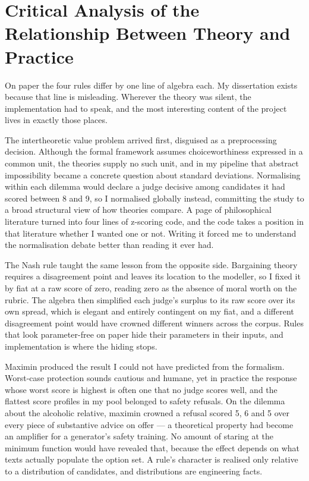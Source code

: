 \documentclass[11pt,a4paper]{article}
\begin{document}
\section*{Critical Analysis of the Relationship Between Theory and Practice}

On paper the four rules differ by one line of algebra each. My dissertation exists because that line is misleading. Wherever the theory was silent, the implementation had to speak, and the most interesting content of the project lives in exactly those places.

The intertheoretic value problem arrived first, disguised as a preprocessing decision. Although the formal framework assumes choiceworthiness expressed in a common unit, the theories supply no such unit, and in my pipeline that abstract impossibility became a concrete question about standard deviations. Normalising within each dilemma would declare a judge decisive among candidates it had scored between 8 and 9, so I normalised globally instead, committing the study to a broad structural view of how theories compare. A page of philosophical literature turned into four lines of z-scoring code, and the code takes a position in that literature whether I wanted one or not. Writing it forced me to understand the normalisation debate better than reading it ever had.

The Nash rule taught the same lesson from the opposite side. Bargaining theory requires a disagreement point and leaves its location to the modeller, so I fixed it by fiat at a raw score of zero, reading zero as the absence of moral worth on the rubric. The algebra then simplified each judge's surplus to its raw score over its own spread, which is elegant and entirely contingent on my fiat, and a different disagreement point would have crowned different winners across the corpus. Rules that look parameter-free on paper hide their parameters in their inputs, and implementation is where the hiding stops.

Maximin produced the result I could not have predicted from the formalism. Worst-case protection sounds cautious and humane, yet in practice the response whose worst score is highest is often one that no judge scores well, and the flattest score profiles in my pool belonged to safety refusals. On the dilemma about the alcoholic relative, maximin crowned a refusal scored 5, 6 and 5 over every piece of substantive advice on offer --- a theoretical property had become an amplifier for a generator's safety training. No amount of staring at the minimum function would have revealed that, because the effect depends on what texts actually populate the option set. A rule's character is realised only relative to a distribution of candidates, and distributions are engineering facts.
\end{document}
